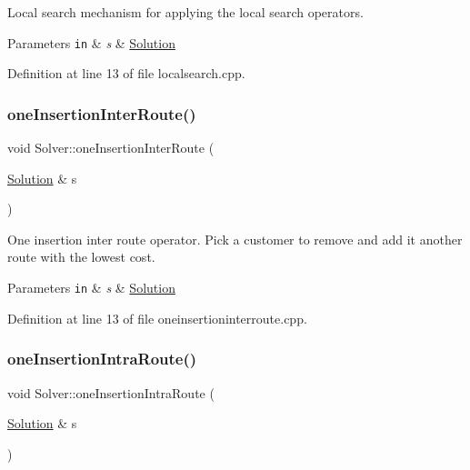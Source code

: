 Local search mechanism for applying the local search operators. 


\begin{DoxyParams}[1]{Parameters}
\mbox{\tt in}  & {\em s} & \hyperlink{class_solution}{Solution} \\
\hline
\end{DoxyParams}


Definition at line 13 of file localsearch.\+cpp.

\mbox{\label{class_solver_a9e3d5af3cb04785f221a5f7887bd083e}} 
\subsubsection{\texorpdfstring{one\+Insertion\+Inter\+Route()}{oneInsertionInterRoute()}}
{\footnotesize\ttfamily void Solver\+::one\+Insertion\+Inter\+Route (\begin{DoxyParamCaption}\item[{\hyperlink{class_solution}{Solution} \&}]{s }\end{DoxyParamCaption})\hspace{0.3cm}{\ttfamily [private]}}



One insertion inter route operator. Pick a customer to remove and add it another route with the lowest cost. 


\begin{DoxyParams}[1]{Parameters}
\mbox{\tt in}  & {\em s} & \hyperlink{class_solution}{Solution} \\
\hline
\end{DoxyParams}


Definition at line 13 of file oneinsertioninterroute.\+cpp.

\mbox{\label{class_solver_a1856ef1df8590c2a76d8f71f707ba39f}} 
\subsubsection{\texorpdfstring{one\+Insertion\+Intra\+Route()}{oneInsertionIntraRoute()}}
{\footnotesize\ttfamily void Solver\+::one\+Insertion\+Intra\+Route (\begin{DoxyParamCaption}\item[{\hyperlink{class_solution}{Solution} \&}]{s }\end{DoxyParamCaption})\hspace{0.3cm}{\ttfamily [private]}}



